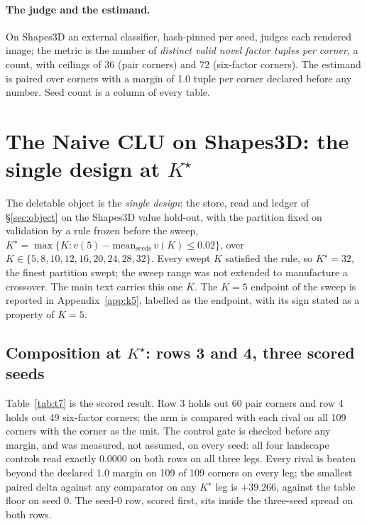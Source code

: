 \documentclass{article} %
\newcommand{\Kstar}{\ensuremath{K^{\star}}}
\begin{document}
\paragraph{The judge and the estimand.} On Shapes3D an external classifier, hash-pinned per
seed, judges each rendered image; the metric is the number of \emph{distinct valid novel
factor tuples per corner}, a count, with ceilings of 36 (pair corners) and 72 (six-factor
corners). The estimand is paired over corners with a margin of 1.0 tuple per corner declared
before any number. %
Seed count is a column of every table.

\section{The Naive CLU on Shapes3D: the single design at $\Kstar$}
\label{sec:shapes}

The deletable object is the \emph{single design}: the store, read and ledger of
\S\ref{sec:object} on the Shapes3D value hold-out, with the partition fixed on validation
by a rule frozen before the sweep, $\Kstar=\max\{K : v(5)-\text{mean}_{\text{seeds}}\,v(K)\le
0.02\}$, over $K\in\{5,8,10,12,16,20,24,28,32\}$. Every swept $K$ satisfied the rule, so
$\Kstar=32$, the finest partition swept; the sweep range was not extended to manufacture a
crossover. %
The main text carries this one $K$. The $K=5$ endpoint of the sweep is reported in
Appendix~\ref{app:k5}, labelled as the endpoint, with its sign stated as a property of $K=5$.

\subsection{Composition at $\Kstar$: rows 3 and 4, three scored seeds}
\label{sec:shapes-t7}

Table~\ref{tab:t7} is the scored result. Row 3 holds out 60 pair corners and row 4 holds out
49 six-factor corners; the arm is compared with each rival on all 109 corners with the corner
as the unit. %
The control gate is checked before any margin, and was measured, not assumed, on every seed:
all four landscape controls read exactly 0.0000 on both rows on all three legs.
Every rival is beaten beyond the declared 1.0 margin on 109 of 109 corners on every leg; the
smallest paired delta against any comparator on any $\Kstar$ leg is $+39.266$, against the
table floor on seed 0. %
The seed-0 row, scored first, sits inside the three-seed spread on both rows.
\end{document}
